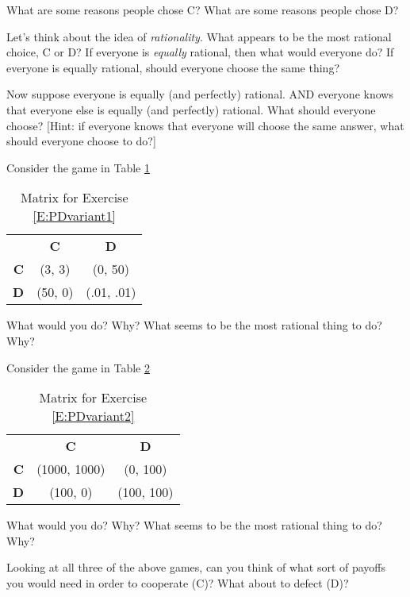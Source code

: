 \begin{xca}\label{E:CWPDreasons}
What are some reasons people chose C? What are some reasons people chose D? 
\end{xca}

\begin{xca}\label{E:CWPDrational} 
Let's think about the idea of \emph{rationality}. What appears to be the most rational choice, C or D? If everyone is \emph{equally} rational, then what would everyone do? If everyone is equally rational, should everyone choose the same thing?
\end{xca}

\begin{xca}\label{E:CWPDsame}
Now suppose everyone is equally (and perfectly) rational. AND everyone knows that everyone else is equally (and perfectly) rational. What should everyone choose? [Hint: if everyone knows that everyone will choose the same answer, what should everyone choose to do?]
\end{xca}

\begin{xca}\label{E:PDvariant1}
Consider the game in Table \ref{T:PDvariant1} 

\begin{table}[h]
\begin{tabular}{rcc}
&\textbf{C}&\textbf{D}\\ 
\textbf{C} &(3, 3)&(0, 50) \\ 
\textbf{D}&(50, 0)&(.01, .01) \\ 
\end{tabular}
\caption{Matrix for Exercise \ref{E:PDvariant1}}
\label{T:PDvariant1}
\end{table}

What would you do? Why? What seems to be the most rational thing to do? Why?
\end{xca}

\begin{xca}\label{E:PDvariant2}
Consider the game in Table \ref{T:PDvariant2}
 
\begin{table}[h]
\begin{tabular}{rcc}
&\textbf{C}&\textbf{D}\\ 
\textbf{C} &(1000, 1000)&(0, 100) \\ 
\textbf{D}&(100, 0)&(100, 100) \\ 
\end{tabular}
\caption{Matrix for Exercise \ref{E:PDvariant2}}
\label{T:PDvariant2}
\end{table}

What would you do? Why? What seems to be the most rational thing to do? Why?
\end{xca}

\begin{xca}\label{E:CWPDpayoffs} 
Looking at all three of the above games, can you think of what sort of payoffs you would need in order to cooperate (C)? What about to defect (D)?
\end{xca}

